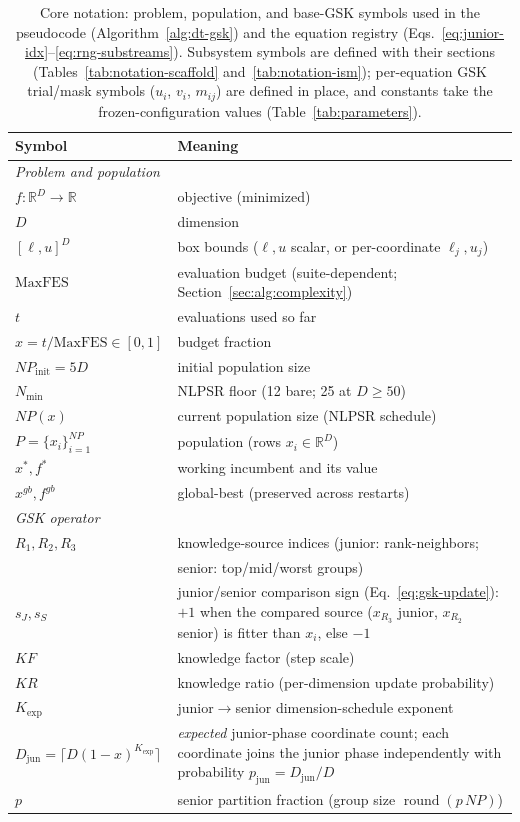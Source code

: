 \begin{table}[t]
\caption{Core notation: problem, population, and base-GSK symbols used in the
pseudocode (Algorithm~\ref{alg:dt-gsk}) and the equation registry
(Eqs.~\ref{eq:junior-idx}--\ref{eq:rng-substreams}). Subsystem symbols are
defined with their sections (Tables~\ref{tab:notation-scaffold}
and~\ref{tab:notation-ism}); per-equation GSK trial/mask symbols ($u_i$, $v_i$,
$m_{ij}$) are defined in place, and constants take the frozen-configuration
values (Table~\ref{tab:parameters}).}
\label{tab:notation}
\centering
\footnotesize
\begin{tabular}{@{}l@{\hspace{1.2em}}p{}@{}}
\toprule
\textbf{Symbol} & \textbf{Meaning}\\
\midrule
\multicolumn{2}{l}{\emph{Problem and population}}\\
\midrule
$f:\mathbb{R}^D\to\mathbb{R}$ & objective (minimized)\\
$D$ & dimension\\
$[\ell,u]^D$ & box bounds ($\ell,u$ scalar, or per-coordinate $\ell_j,u_j$)\\
$\text{MaxFES}$ & evaluation budget (suite-dependent; Section~\ref{sec:alg:complexity})\\
$t$ & evaluations used so far\\
$x = t/\text{MaxFES}\in[0,1]$ & budget fraction\\
$NP_{\text{init}} = 5D$ & initial population size\\
$N_{\min}$ & NLPSR floor (12 bare; 25 at $D\ge50$)\\
$NP(x)$ & current population size (NLPSR schedule)\\
$P=\{x_i\}_{i=1}^{NP}$ & population (rows $x_i\in\mathbb{R}^D$)\\
$x^{*}, f^{*}$ & working incumbent and its value\\
$x^{gb}, f^{gb}$ & global-best (preserved across restarts)\\
\midrule
\multicolumn{2}{l}{\emph{GSK operator}}\\
\midrule
$R_1,R_2,R_3$ & knowledge-source indices (junior: rank-neighbors;\\
              & \quad senior: top/mid/worst groups)\\
$s_J,s_S$ & junior/senior comparison sign (Eq.~\ref{eq:gsk-update}): $+1$ when
the compared source ($x_{R_3}$ junior, $x_{R_2}$ senior) is fitter than $x_i$,
else $-1$\\
$KF$ & knowledge factor (step scale)\\
$KR$ & knowledge ratio (per-dimension update probability)\\
$K_{\exp}$ & junior$\to$senior dimension-schedule exponent\\
$D_{\text{jun}}=\lceil D(1-x)^{K_{\exp}}\rceil$ & \emph{expected} junior-phase coordinate count; each coordinate joins the junior phase independently with probability $p_{\text{jun}}=D_{\text{jun}}/D$\\
$p$ & senior partition fraction (group size $\operatorname{round}(p\,NP)$)\\
\bottomrule
\end{tabular}
\end{table}
